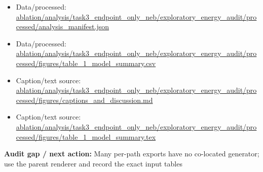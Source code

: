 \documentclass[10pt]{article}
\newcommand{\statusline}[1]{\colorbox{gray!12}{\parbox{0.96\linewidth}{#1}}}
\begin{document}
\begin{itemize}[leftmargin=1.4em,noitemsep]
\item Data/processed: \begingroup\scriptsize\url{ablation/analysis/task3_endpoint_only_neb/exploratory_energy_audit/processed/analysis_manifest.json}\endgroup
\item Data/processed: \begingroup\scriptsize\url{ablation/analysis/task3_endpoint_only_neb/exploratory_energy_audit/processed/figures/table_1_model_summary.csv}\endgroup
\item Caption/text source: \begingroup\scriptsize\url{ablation/analysis/task3_endpoint_only_neb/exploratory_energy_audit/processed/figures/captions_and_discussion.md}\endgroup
\item Caption/text source: \begingroup\scriptsize\url{ablation/analysis/task3_endpoint_only_neb/exploratory_energy_audit/processed/figures/table_1_model_summary.tex}\endgroup
\end{itemize}
\statusline{\textbf{Audit gap / next action:} Many per-path exports have no co-located generator; use the parent renderer and record the exact input tables}
\vfill
\clearpage
\end{document}
